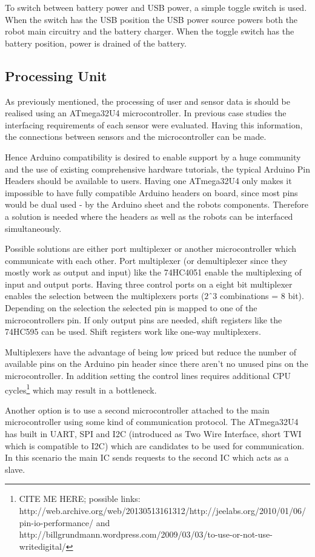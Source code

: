 \documentclass[11pt,a4paper]{article}
\begin{document}
To switch between battery power and USB power, a simple toggle switch is used. When the switch has the USB position the USB power source powers both the robot main circuitry and the battery charger. When the toggle switch has the battery position, power is drained of the battery.

\subsection{Processing Unit}
As previously mentioned, the processing of user and sensor data is should be realised using an ATmega32U4 microcontroller. In previous case studies the interfacing requirements of each sensor were evaluated. Having this information, the connections between sensors and the microcontroller can be made.

Hence Arduino compatibility is desired to enable support by a huge community and the use of existing comprehensive hardware tutorials, the typical Arduino Pin Headers should be available to users. Having one ATmega32U4 only makes it impossible to have fully compatible Arduino headers on board, since most pins would be dual used  - by the Arduino sheet and the robots components. Therefore a solution is needed where the headers as well as the robots can be interfaced simultaneously.

Possible solutions are either port multiplexer or another microcontroller which communicate with each other. Port multiplexer (or demultiplexer since they mostly work as output and input) like the 74HC4051 enable the multiplexing of input and output ports. Having three control ports on a eight bit multiplexer enables the selection between the multiplexers ports ($2ˆ3$ combinations = 8 bit). Depending on the selection the selected pin is mapped to one of the microcontrollers pin. If only output pins are needed, shift registers like the 74HC595 can be used. Shift registers work like one-way multiplexers.

Multiplexers have the advantage of being low priced but reduce the number of available pins on the Arduino pin header since there aren't no unused pins on the microcontroller. In addition setting the control lines requires additional CPU cycles\footnote{CITE ME HERE; possible links: http://web.archive.org/web/20130513161312/http://jeelabs.org/2010/01/06/pin-io-performance/ and http://billgrundmann.wordpress.com/2009/03/03/to-use-or-not-use-writedigital/} which may result in a bottleneck. 

Another option is to use a second microcontroller attached to the main microcontroller using some kind of communication protocol. The ATmega32U4 has built in UART, SPI and I2C (introduced as Two Wire Interface, short TWI which is compatible to I2C) which are candidates to be used for communication. In this scenario the main IC sends requests to the second IC which acts as a slave.
\end{document}
